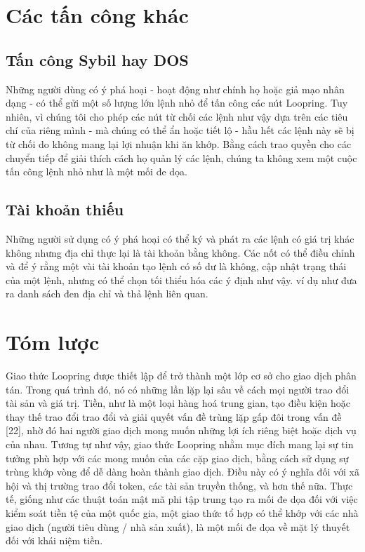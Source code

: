 \documentclass[12pt,a4paper]{article}
\begin{document}
\begin{multicols}{2}
\section{Các tấn công khác}

\subsection{Tấn công Sybil hay DOS}
Những người dùng có ý phá hoại - hoạt động như chính họ hoặc giả mạo nhân dạng - có thể gửi một số lượng lớn lệnh nhỏ để tấn công các nút Loopring. Tuy nhiên, vì chúng tôi cho phép các nút từ chối các lệnh như vậy dựa trên các tiêu chí của riêng mình - mà chúng có thể ẩn hoặc tiết lộ - hầu hết các lệnh này sẽ bị từ chối do không mang lại lợi nhuận khi ăn khớp. Bằng cách trao quyền cho các chuyển tiếp để giải thích cách họ quản lý các lệnh, chúng ta không xem một cuộc tấn công lệnh nhỏ như là một mối đe dọa.

\subsection{Tài khoản thiếu}
Những người sử dụng có ý phá hoại có thể ký và phát ra các lệnh có giá trị khác không nhưng địa chỉ thực lại là tài khoản bằng không. Các nốt có thể điều chỉnh và để ý rằng một vài tài khoản tạo lệnh có số dư là không, cập nhật trạng thái của một lệnh, nhưng có thể chọn tối thiểu hóa các ý định như vậy. ví dụ như đưa ra danh sách đen địa chỉ và thả lệnh liên quan.

\section{Tóm lược}
Giao thức Loopring được thiết lập để trở thành một lớp cơ sở cho giao dịch phân tán. Trong quá trình đó, nó có những lần lặp lại sâu về cách mọi người trao đổi tài sản và giá trị. Tiền, như là một loại hàng hoá trung gian, tạo điều kiện hoặc thay thế trao đổi trao đổi và giải quyết vấn đề trùng lặp gấp đôi trong vấn đề [22], nhờ đó hai người giao dịch mong muốn những lợi ích riêng biệt hoặc dịch vụ của nhau. Tương tự như vậy, giao thức Loopring nhằm mục đích mang lại sự tin tưởng phù hợp với các mong muốn của các cặp giao dịch, bằng cách sử dụng sự trùng khớp vòng để dễ dàng hoàn thành giao dịch. Điều này có ý nghĩa đối với xã hội và thị trường trao đổi token, các tài sản truyền thống, và hơn thế nữa. Thực tế, giống như các thuật toán mật mã phi tập trung tạo ra mối đe dọa đối với việc kiểm soát tiền tệ của một quốc gia, một giao thức tổ hợp có thể khớp với các nhà giao dịch (người tiêu dùng / nhà sản xuất), là một mối đe dọa về mặt lý thuyết đối với khái niệm tiền.


\end{multicols}
\end{document}
